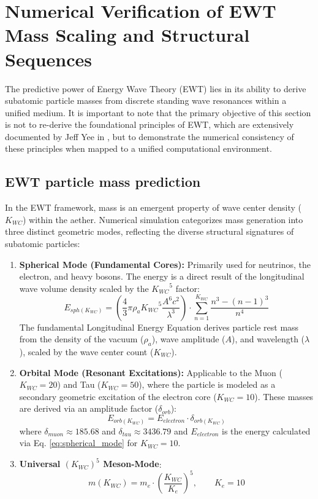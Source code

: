 \documentclass[10pt,a4paper]{article}
\begin{document}
\section{Numerical Verification of EWT Mass Scaling and Structural Sequences}
\label{sec:numerical_verification_ewt}

The predictive power of Energy Wave Theory (EWT) lies in its ability to derive subatomic particle masses from discrete standing wave resonances within a unified medium. It is important to note that the primary objective of this section is not to re-derive the foundational principles of EWT, which are extensively documented by Jeff Yee in \cite{yee2019geometry, yee2024particle_sequence, yee2018periodic_table}, but to demonstrate the numerical consistency of these principles when mapped to a unified computational environment.

\subsection{EWT particle mass prediction}

In the EWT framework, mass is an emergent property of wave center density ($K_{WC}$) within the aether. Numerical simulation categorizes mass generation into three distinct geometric modes, reflecting the diverse structural signatures of subatomic particles:

\begin{enumerate}
	\item \textbf{Spherical Mode (Fundamental Cores):} Primarily used for neutrinos, the electron, and heavy bosons. The energy is a direct result of the longitudinal wave volume density scaled by the ${K_{WC}}^5$ factor:
	\begin{equation}
		E_{sph(K_{WC})} = \left( \frac{4}{3} \pi \rho_a {K_{WC}}^{5} \frac{A^6 c^2}{\lambda^3} \right) \cdot \sum_{n=1}^{K_{WC}} \frac{n^3 - (n-1)^3}{n^4}
		\label{eq:spherical_mode}
	\end{equation}
	The fundamental Longitudinal Energy Equation derives particle rest mass from the density of the vacuum ($\rho_a$), wave amplitude ($A$), and wavelength ($\lambda$), scaled by the wave center count ($K_{WC}$).
	
	\item \textbf{Orbital Mode (Resonant Excitations):} Applicable to the Muon ($K_{WC}=20$) and Tau ($K_{WC}=50$), where the particle is modeled as a secondary geometric excitation of the electron core ($K_{WC}=10$). These masses are derived via an amplitude factor ($\delta_{orb}$):
	\begin{equation}
		E_{orb(K_{WC})} = E_{electron} \cdot \delta_{orb(K_{WC})}
	\end{equation}
	where $\delta_{muon} \approx 185.68$ and $\delta_{tau} \approx 3436.79$ and $E_{electron}$ is the energy calculated via Eq. \eqref{eq:spherical_mode} for $K_{WC}=10$.
	\item \textbf{Universal $({K_{WC}})^5$ Meson-Mode}:
	\begin{equation}
		m(K_{WC}) = m_e \cdot \left(\frac{K_{WC}}{K_e}\right)^5, \qquad K_e = 10
		\label{eq:meson_mode}
	\end{equation}

\end{enumerate}
\end{document}

